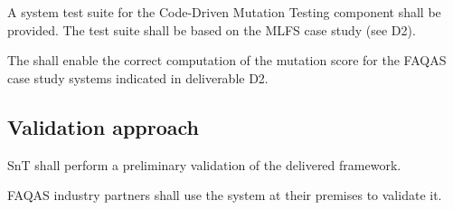  \RQ{} A system test suite for the Code-Driven Mutation Testing component shall be provided. The test suite shall be based on the MLFS case study (see D2).

 \RQ{} The \FAQAS shall enable the correct computation of the mutation score for the FAQAS case study systems indicated in deliverable D2.

 \subsection{Validation approach}

\RQ{} SnT shall perform a preliminary validation of the delivered framework.

\RQ{} FAQAS industry partners shall use the system at their premises to validate it.
